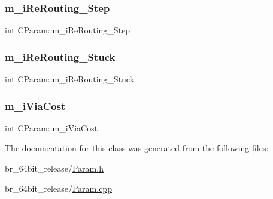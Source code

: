 \mbox{\label{classCParam_a7cc9b8a4ed5e875571d147f0aa9cca3d}} 
\subsubsection{\texorpdfstring{m\_iReRouting\_Step}{m\_iReRouting\_Step}}
{\footnotesize\ttfamily int C\+Param\+::m\+\_\+i\+Re\+Routing\+\_\+\+Step}

\mbox{\label{classCParam_ad30c8b944f33460338828f2b8e1d2f46}} 
\subsubsection{\texorpdfstring{m\_iReRouting\_Stuck}{m\_iReRouting\_Stuck}}
{\footnotesize\ttfamily int C\+Param\+::m\+\_\+i\+Re\+Routing\+\_\+\+Stuck}

\mbox{\label{classCParam_acf9d94ab238c68576d79711cd1e3f86d}} 
\subsubsection{\texorpdfstring{m\_iViaCost}{m\_iViaCost}}
{\footnotesize\ttfamily int C\+Param\+::m\+\_\+i\+Via\+Cost}



The documentation for this class was generated from the following files\+:\begin{DoxyCompactItemize}
\item 
br\+\_\+64bit\+\_\+release/\mbox{\hyperlink{Param_8h}{Param.\+h}}\item 
br\+\_\+64bit\+\_\+release/\mbox{\hyperlink{Param_8cpp}{Param.\+cpp}}\end{DoxyCompactItemize}
